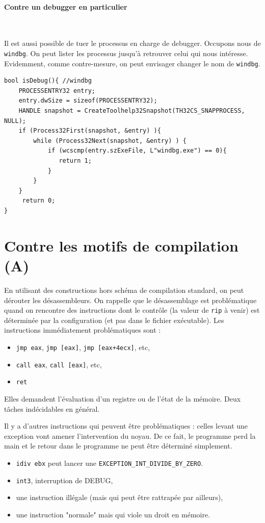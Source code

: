 \documentclass{book}
\newcommand{\code}[1]{\texttt{#1}}
\begin{document}
\paragraph{Contre un debugger en particulier}~

\medskip Il est aussi possible de tuer le processus en charge de debugger. Occupons nous de \code{windbg}. On peut lister les processus jusqu'à retrouver celui qui nous intéresse. Evidemment, comme contre-mesure, on peut envisager changer le nom de {\tt windbg}. 

\begin{verbatim}
bool isDebug(){ //windbg
    PROCESSENTRY32 entry;
    entry.dwSize = sizeof(PROCESSENTRY32);
    HANDLE snapshot = CreateToolhelp32Snapshot(TH32CS_SNAPPROCESS, NULL);
    if (Process32First(snapshot, &entry) ){
        while (Process32Next(snapshot, &entry) ) {
            if (wcscmp(entry.szExeFile, L"windbg.exe") == 0){
               return 1;
            }
        }
    }
     return 0;
}
\end{verbatim}


\section{Contre les motifs de compilation (A)}

En utilisant des constructions hors schéma de compilation standard, on peut dérouter les désassembleurs. On rappelle que le désassemblage est problématique quand on rencontre des instructions dont le contrôle (la valeur de {\tt rip} à venir) est déterminée par la configuration (et pas dans le fichier exécutable).  Les instructions immédiatement problématiques sont : 
\begin{itemize}
	\item \code{jmp eax}, \code{jmp [eax]}, \code{jmp [eax+4ecx]}, etc,
	\item \code{call eax}, \code{call [eax]}, etc,
	\item \code{ret}
\end{itemize}

Elles demandent l'évaluation d'un registre ou de l'état de la mémoire. Deux tâches indécidables en général. 

Il y a d'autres instructions qui peuvent être problématiques : celles levant une exception vont amener l'intervention du noyau. De ce fait, le programme perd la main et le retour dans le programme ne peut être déterminé simplement. 
\begin{itemize}
	\item \code{idiv ebx} peut lancer une \code{EXCEPTION\_INT\_DIVIDE\_BY\_ZERO}.
	\item \code{int3}, interruption de DEBUG,
	\item une instruction illégale (mais qui peut être rattrapée par ailleurs), 
	\item une instruction "normale" mais qui viole un droit en mémoire.	
\end{itemize}
\end{document}
